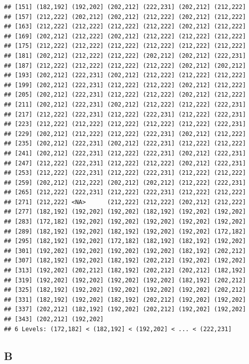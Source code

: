 \documentclass[
]{article}
\begin{document}
\begin{verbatim}
## [151] (182,192] (192,202] (202,212] (222,231] (202,212] (212,222]
## [157] (212,222] (202,212] (202,212] (212,222] (202,212] (212,222]
## [163] (212,222] (212,222] (212,222] (212,222] (202,212] (212,222]
## [169] (202,212] (212,222] (202,212] (212,222] (212,222] (212,222]
## [175] (212,222] (212,222] (212,222] (212,222] (212,222] (212,222]
## [181] (202,212] (212,222] (212,222] (202,212] (202,212] (222,231]
## [187] (212,222] (212,222] (212,222] (212,222] (202,212] (202,212]
## [193] (202,212] (222,231] (202,212] (212,222] (212,222] (212,222]
## [199] (202,212] (222,231] (212,222] (212,222] (202,212] (212,222]
## [205] (202,212] (222,231] (212,222] (212,222] (202,212] (212,222]
## [211] (202,212] (222,231] (202,212] (212,222] (212,222] (222,231]
## [217] (212,222] (222,231] (212,222] (222,231] (212,222] (222,231]
## [223] (212,222] (212,222] (212,222] (212,222] (212,222] (222,231]
## [229] (202,212] (212,222] (212,222] (222,231] (202,212] (212,222]
## [235] (202,212] (222,231] (202,212] (222,231] (212,222] (212,222]
## [241] (202,212] (222,231] (212,222] (222,231] (202,212] (222,231]
## [247] (212,222] (222,231] (212,222] (212,222] (202,212] (222,231]
## [253] (212,222] (222,231] (212,222] (222,231] (212,222] (212,222]
## [259] (202,212] (212,222] (202,212] (202,212] (212,222] (222,231]
## [265] (212,222] (222,231] (212,222] (222,231] (212,222] (212,222]
## [271] (212,222] <NA>      (212,222] (212,222] (202,212] (212,222]
## [277] (182,192] (192,202] (192,202] (182,192] (192,202] (192,202]
## [283] (172,182] (192,202] (192,202] (192,202] (192,202] (192,202]
## [289] (182,192] (192,202] (182,192] (192,202] (192,202] (172,182]
## [295] (182,192] (192,202] (172,182] (182,192] (182,192] (192,202]
## [301] (192,202] (192,202] (192,202] (192,202] (182,192] (202,212]
## [307] (182,192] (192,202] (182,192] (202,212] (192,202] (192,202]
## [313] (192,202] (202,212] (182,192] (202,212] (202,212] (182,192]
## [319] (192,202] (192,202] (192,202] (192,202] (182,192] (202,212]
## [325] (182,192] (192,202] (192,202] (192,202] (192,202] (202,212]
## [331] (182,192] (192,202] (182,192] (202,212] (192,202] (192,202]
## [337] (202,212] (182,192] (192,202] (202,212] (192,202] (192,202]
## [343] (202,212] (192,202]
## 6 Levels: (172,182] < (182,192] < (192,202] < ... < (222,231]
\end{verbatim}

\hypertarget{b-1}{%
\subsection{B}\label{b-1}}
\end{document}

